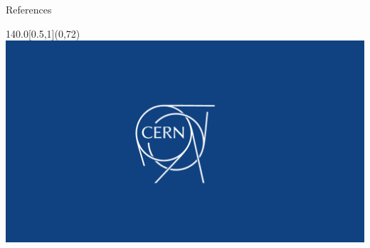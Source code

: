 \documentclass{beamer}
\begin{document}

\section{}

\begin{frame}[allowframebreaks]{References}{}


\end{frame}

{
\begin{frame}{}{}
\begin{textblock}{140.0}[0.5,1](0,72) %
\includegraphics[width=\textwidth]{images/CERN_logo_bg}
\end{textblock}
\end{frame}
}
\end{document}
